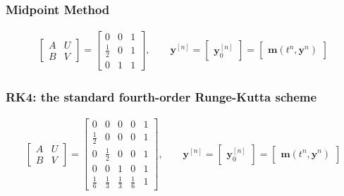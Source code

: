 \subsubsection{Midpoint Method}
\begin{align*}
  \left[\begin{array}{c|c}
  A & U \\
  \hline
  B & V
  \end{array}\right] =
  \left[\begin{array}{cc|c}
  0 & 0 & 1 \\
  \frac{1}{2} & 0 & 1 \\
  \hline
  0 & 1 & 1
  \end{array}\right],\qquad
  \boldsymbol{y}^{[n]}=
  \left[\begin{array}{c}
  \boldsymbol{y}^{[n]}_0
  \end{array}\right]=
  \left[\begin{array}{c}
  \boldsymbol{m}\left(t^n,\boldsymbol{y}^{n}\right)
  \end{array}\right]
\end{align*}

\subsubsection{RK4: the standard fourth-order Runge-Kutta scheme}
\begin{align*}
  \left[\begin{array}{c|c}
  A & U \\
  \hline
  B & V
  \end{array}\right] =
  \left[\begin{array}{cccc|c}
  0 & 0 & 0 & 0 & 1 \\
  \frac{1}{2} & 0 & 0 & 0 & 1 \\
  0 & \frac{1}{2} & 0 & 0 & 1 \\
  0 & 0 & 1 & 0 & 1 \\
  \hline
  \frac{1}{6} & \frac{1}{3} & \frac{1}{3} & \frac{1}{6} & 1
  \end{array}\right],\qquad
  \boldsymbol{y}^{[n]}=
  \left[\begin{array}{c}
  \boldsymbol{y}^{[n]}_0
  \end{array}\right]=
  \left[\begin{array}{c}
  \boldsymbol{m}\left(t^n,\boldsymbol{y}^{n}\right)
  \end{array}\right]
\end{align*}

